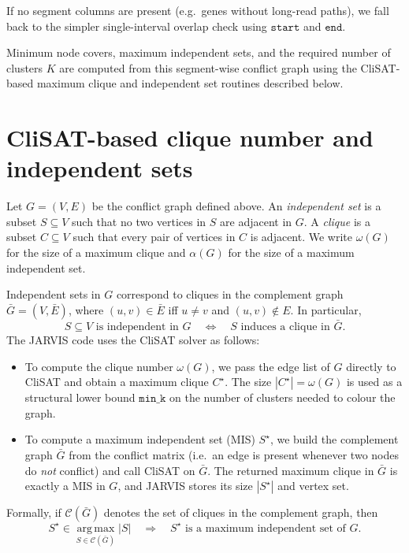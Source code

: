 \documentclass[11pt]{article}
\begin{document}
If no segment columns are present (e.g.\ genes without long-read paths),
we fall back to the simpler single-interval overlap check using
\(\texttt{start}\) and \(\texttt{end}\).

Minimum node covers, maximum independent sets, and the required number of
clusters \(K\) are computed from this segment-wise conflict graph using the
CliSAT-based maximum clique and independent set routines described below.

\section{CliSAT-based clique number and independent sets}

Let \(G = (V,E)\) be the conflict graph defined above. An \emph{independent
set} is a subset \(S \subseteq V\) such that no two vertices in \(S\) are
adjacent in \(G\). A \emph{clique} is a subset \(C \subseteq V\) such that
every pair of vertices in \(C\) is adjacent. We write \(\omega(G)\) for the
size of a maximum clique and \(\alpha(G)\) for the size of a maximum
independent set.

Independent sets in \(G\) correspond to cliques in the complement graph
\(\bar{G} = (V,\bar{E})\), where \((u,v) \in \bar{E}\) iff \(u \neq v\) and
\((u,v) \notin E\). In particular,
\[
  S \subseteq V \text{ is independent in } G
  \quad\Leftrightarrow\quad
  S \text{ induces a clique in } \bar{G}.
\]
The JARVIS code uses the CliSAT solver as follows:
\begin{itemize}
  \item To compute the clique number \(\omega(G)\), we pass the edge list of
  \(G\) directly to CliSAT and obtain a maximum clique \(C^\star\). The size
  \(|C^\star| = \omega(G)\) is used as a structural lower bound
  \(\texttt{min\_k}\) on the number of clusters needed to colour the graph.
  \item To compute a maximum independent set (MIS) \(S^\star\), we build the
  complement graph \(\bar{G}\) from the conflict matrix (i.e.\ an edge is
  present whenever two nodes do \emph{not} conflict) and call CliSAT on
  \(\bar{G}\). The returned maximum clique in \(\bar{G}\) is exactly a MIS in
  \(G\), and JARVIS stores its size \(|S^\star|\) and vertex set.
\end{itemize}
Formally, if \(\mathcal{C}(\bar{G})\) denotes the set of cliques in the
complement graph, then
\[
  S^\star \in \operatorname*{arg\,max}_{S \in \mathcal{C}(\bar{G})} |S|
  \quad\Rightarrow\quad
  S^\star \text{ is a maximum independent set of } G.
\]
\end{document}
